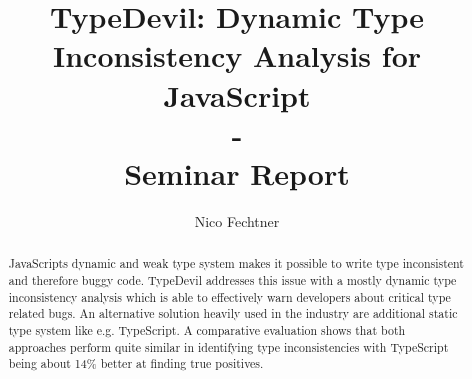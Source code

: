 \documentclass[runningheads,a4paper]{llncs}
\newcommand{\keywords}[1]{\par\addvspace\baselineskip

\noindent\keywordname\enspace\ignorespaces#1}
\begin{document}

\mainmatter  %

\title{TypeDevil: Dynamic Type Inconsistency Analysis for JavaScript\\-\\Seminar Report}


\author{Nico Fechtner}
%


%
%

\toctitle{}
\tocauthor{}
\maketitle

\setcounter{tocdepth}{2}
\tableofcontents
\newpage

\begin{abstract}
JavaScripts dynamic and weak type system makes it possible to write type inconsistent and therefore buggy code. 
TypeDevil addresses this issue with a mostly dynamic type inconsistency analysis which is able to effectively warn developers about critical type related bugs.
An alternative solution heavily used in the industry are additional static type system like e.g. TypeScript.
A comparative evaluation shows that both approaches perform quite similar in identifying type inconsistencies with TypeScript being about 14\% better at finding true positives.
\end{abstract}
\end{document}

